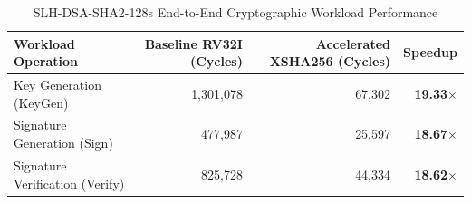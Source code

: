 \begin{table}[htbp]
\centering
\caption{SLH-DSA-SHA2-128s End-to-End Cryptographic Workload Performance}
\label{tab:slhdsa_benchmark}
\begin{tabular}{lrrr}
\hline
\textbf{Workload Operation} & \textbf{Baseline RV32I (Cycles)} & \textbf{Accelerated XSHA256 (Cycles)} & \textbf{Speedup} \\
\hline
Key Generation (KeyGen) & 1,301,078 & 67,302 & \textbf{19.33$\times$} \\
Signature Generation (Sign) & 477,987 & 25,597 & \textbf{18.67$\times$} \\
Signature Verification (Verify) & 825,728 & 44,334 & \textbf{18.62$\times$} \\
\hline
\end{tabular}
\end{table}
